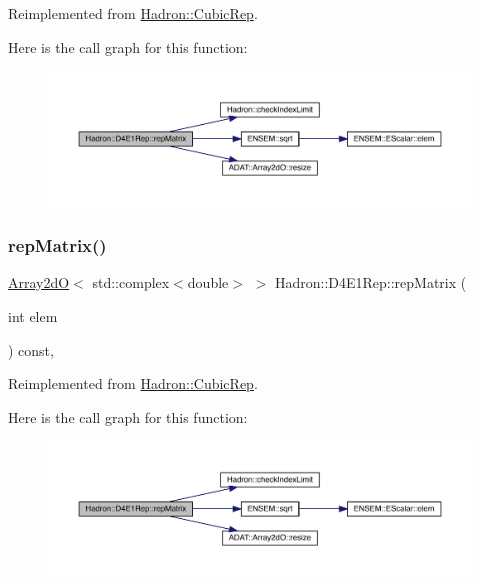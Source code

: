 Reimplemented from \mbox{\hyperlink{structHadron_1_1CubicRep_ac5d7e9e6f4ab1158b5fce3e4ad9e8005}{Hadron\+::\+Cubic\+Rep}}.

Here is the call graph for this function\+:
\nopagebreak
\begin{figure}[H]
\begin{center}
\leavevmode
\includegraphics[width=350pt]{da/d78/structHadron_1_1D4E1Rep_a8a0fcfa06e2a36d6835bab2431654a2f_cgraph}
\end{center}
\end{figure}
\mbox{\label{structHadron_1_1D4E1Rep_a8a0fcfa06e2a36d6835bab2431654a2f}} 
\subsubsection{\texorpdfstring{repMatrix()}{repMatrix()}\hspace{0.1cm}{\footnotesize\ttfamily [3/3]}}
{\footnotesize\ttfamily \mbox{\hyperlink{classADAT_1_1Array2dO}{Array2dO}}$<$ std\+::complex$<$double$>$ $>$ Hadron\+::\+D4\+E1\+Rep\+::rep\+Matrix (\begin{DoxyParamCaption}\item[{int}]{elem }\end{DoxyParamCaption}) const\hspace{0.3cm}{\ttfamily [inline]}, {\ttfamily [virtual]}}



Reimplemented from \mbox{\hyperlink{structHadron_1_1CubicRep_ac5d7e9e6f4ab1158b5fce3e4ad9e8005}{Hadron\+::\+Cubic\+Rep}}.

Here is the call graph for this function\+:
\nopagebreak
\begin{figure}[H]
\begin{center}
\leavevmode
\includegraphics[width=350pt]{da/d78/structHadron_1_1D4E1Rep_a8a0fcfa06e2a36d6835bab2431654a2f_cgraph}
\end{center}
\end{figure}


